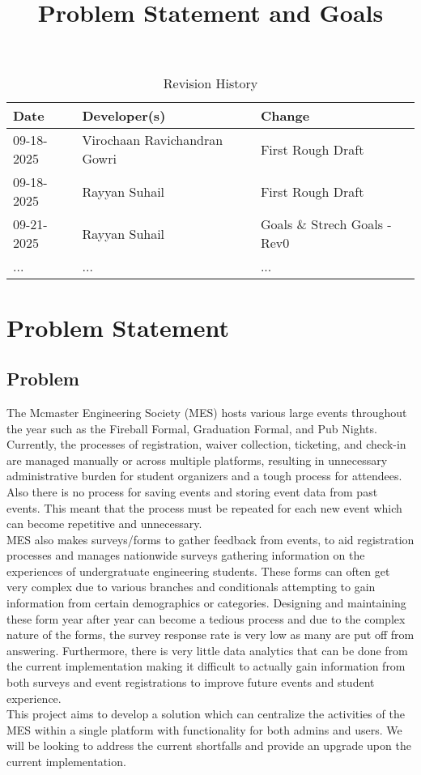 \documentclass{article}
\title{Problem Statement and Goals\\\progname}
\author{\authname}
\date{}
\begin{document}
\maketitle

\begin{table}[hp]
\caption{Revision History} \label{TblRevisionHistory}
\begin{tabularx}{\textwidth}{llX}
\toprule
\textbf{Date} & \textbf{Developer(s)} & \textbf{Change}\\
\midrule
09-18-2025 & Virochaan Ravichandran Gowri & First Rough Draft\\
09-18-2025 & Rayyan Suhail & First Rough Draft\\
09-21-2025 & Rayyan Suhail & Goals \& Strech Goals - Rev0\\
... & ... & ...\\
\bottomrule
\end{tabularx}
\end{table}
\newpage
\section{Problem Statement}

\subsection{Problem}
\hspace*{2em} The Mcmaster Engineering Society (MES) hosts various large events throughout the year such as the Fireball Formal, Graduation Formal, and Pub Nights. Currently, the processes of registration, waiver collection, ticketing, and check-in are managed manually or across multiple platforms, resulting in unnecessary administrative burden for student organizers and a tough process for attendees. Also there is no process for saving events and storing event data from past events. This meant that the process must be repeated for each new event which can become repetitive and unnecessary.\\
\newline
\hspace*{2em} MES also makes surveys/forms to gather feedback from events, to aid registration processes and manages nationwide surveys gathering information on the experiences of undergratuate engineering students. These forms can often get very complex due to various branches and conditionals attempting to gain information from certain demographics or categories. Designing and maintaining these form year after year can become a tedious process and due to the complex nature of the forms, the survey response rate is very low as many are put off from answering. Furthermore, there is very little data analytics that can be done from the current implementation making it difficult to actually gain information from both surveys and event registrations to improve future events and student experience. \\
\newline
\hspace*{2em} This project aims to develop a solution which can centralize the activities of the MES within a single platform with functionality for both admins and users. We will be looking to address the current shortfalls and provide an upgrade upon the current implementation. 
\end{document}

